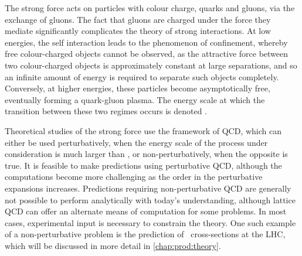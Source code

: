 \begin{table}
  \centering
  \caption{%
    Properties of the fundamental particles of the \acl{SM}~\cite{PDG2014}. The
    electric charge is given in units of the electron charge.
  }
  \label{tab:intro:sm:particles}
  
\end{table}

The strong force acts on particles with colour charge, quarks and gluons, via 
the exchange of gluons.
The fact that gluons are charged under the force they mediate significantly 
complicates the theory of strong interactions.
At low energies, the self interaction leads to the phenomenon of confinement, 
whereby free colour-charged objects cannot be observed, as the attractive force 
between two colour-charged objects is approximately constant at large 
separations, and so an infinite amount of energy is required to separate such 
objects completely.
Conversely, at higher energies, these particles become asymptotically free, 
eventually forming a quark-gluon plasma.
The energy scale at which the transition between these two regimes occurs is 
denoted \qcdscale.

Theoretical studies of the strong force use the framework of \ac{QCD}, which 
can either be used perturbatively, when the energy scale of the process under 
consideration is much larger than \qcdscale, or non-perturbatively, when the 
opposite is true.
It is feasible to make predictions using perturbative \ac{QCD}, although the 
computations become more challenging as the order in the perturbative 
expansions increases.
Predictions requiring non-perturbative \ac{QCD} are generally not possible to 
perform analytically with today's understanding, although lattice \ac{QCD} can 
offer an alternate means of computation for some problems.
In most cases, experimental input is necessary to constrain the theory.
One such example of a non-perturbative problem is the prediction of \pp\ 
cross-sections at the \ac{LHC}, which will be discussed in more detail in 
\cref{chap:prod:theory}.

